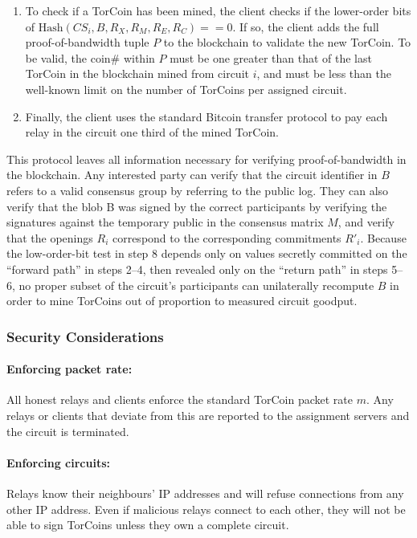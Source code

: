 \begin{enumerate}
\item
To check if a TorCoin has been mined, the client checks if the lower-order
bits of $\textrm{Hash}(CS_i, B, R_X, R_M, R_E, R_C) == 0$.
If so, the client adds the full proof-of-bandwidth tuple $P$
to the blockchain to validate the new TorCoin.
To be valid,
the coin\# within $P$ must be one greater than that
of the last TorCoin in the blockchain mined from circuit $i$,
and must be less than the well-known limit on the number of TorCoins
per assigned circuit.

\item
Finally, the client uses the standard Bitcoin transfer protocol
to pay each relay in the circuit one third of the mined TorCoin. 
\end{enumerate}

This protocol leaves all information necessary
for verifying proof-of-bandwidth in the blockchain.
Any interested party can verify that the circuit identifier in $B$
refers to a valid consensus group by referring to the public log.
They can also verify that the blob B was signed
by the correct participants by verifying the signatures
against the temporary public in the consensus matrix $M$,
and verify that the openings $R_i$ correspond to
the corresponding commitments $R'_i$. 
Because the low-order-bit test in step 8 depends only on values
secretly committed on the ``forward path'' in steps 2--4,
then revealed only on the ``return path'' in steps 5--6,
no proper subset of the circuit's participants can unilaterally recompute $B$
in order to mine TorCoins out of proportion to measured circuit goodput.

\subsubsection{Security Considerations}

\paragraph{Enforcing packet rate:} All honest relays and clients enforce the standard
TorCoin packet rate $m$. Any relays or clients that deviate from this are
reported to the assignment servers and the circuit is terminated.

\paragraph{Enforcing circuits:} Relays know their neighbours'
IP addresses and will refuse connections from any other IP address. Even if
malicious relays connect to each other, they will not be able to sign
TorCoins unless they own a complete circuit.

